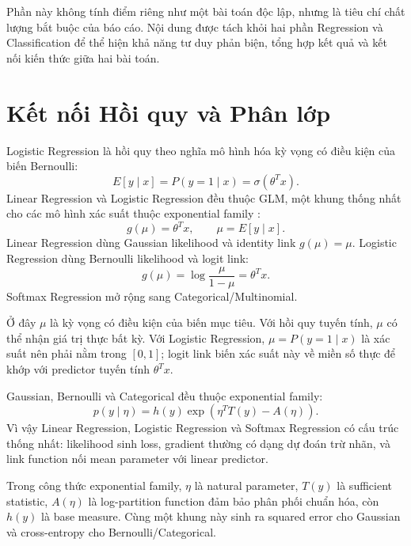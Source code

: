 \documentclass[12pt,a4paper]{article}
\begin{document}
Phần này không tính điểm riêng như một bài toán độc lập, nhưng là tiêu chí chất lượng bắt buộc của báo cáo. Nội dung được tách khỏi hai phần Regression và Classification để thể hiện khả năng tư duy phản biện, tổng hợp kết quả và kết nối kiến thức giữa hai bài toán.

\section{Kết nối Hồi quy và Phân lớp}

Logistic Regression là hồi quy theo nghĩa mô hình hóa kỳ vọng có điều kiện của biến Bernoulli:
\begin{equation}
 E[y\mid x]=P(y=1\mid x)=\sigma(\theta^Tx).
\end{equation}
Linear Regression và Logistic Regression đều thuộc GLM, một khung thống nhất cho các mô hình xác suất thuộc exponential family \cite{murphy2012}:
\begin{equation}
 g(\mu)=\theta^Tx, \qquad \mu=E[y\mid x].
\end{equation}
Linear Regression dùng Gaussian likelihood và identity link $g(\mu)=\mu$. Logistic Regression dùng Bernoulli likelihood và logit link:
\begin{equation}
 g(\mu)=\log\frac{\mu}{1-\mu}=\theta^Tx.
\end{equation}
Softmax Regression mở rộng sang Categorical/Multinomial.

Ở đây $\mu$ là kỳ vọng có điều kiện của biến mục tiêu. Với hồi quy tuyến tính, $\mu$ có thể nhận giá trị thực bất kỳ. Với Logistic Regression, $\mu=P(y=1\mid x)$ là xác suất nên phải nằm trong $[0,1]$; logit link biến xác suất này về miền số thực để khớp với predictor tuyến tính $\theta^Tx$.

Gaussian, Bernoulli và Categorical đều thuộc exponential family:
\begin{equation}
 p(y\mid\eta)=h(y)\exp\left(\eta^TT(y)-A(\eta)\right).
\end{equation}
Vì vậy Linear Regression, Logistic Regression và Softmax Regression có cấu trúc thống nhất: likelihood sinh loss, gradient thường có dạng dự đoán trừ nhãn, và link function nối mean parameter với linear predictor.

Trong công thức exponential family, $\eta$ là natural parameter, $T(y)$ là sufficient statistic, $A(\eta)$ là log-partition function đảm bảo phân phối chuẩn hóa, còn $h(y)$ là base measure. Cùng một khung này sinh ra squared error cho Gaussian và cross-entropy cho Bernoulli/Categorical.
\end{document}
